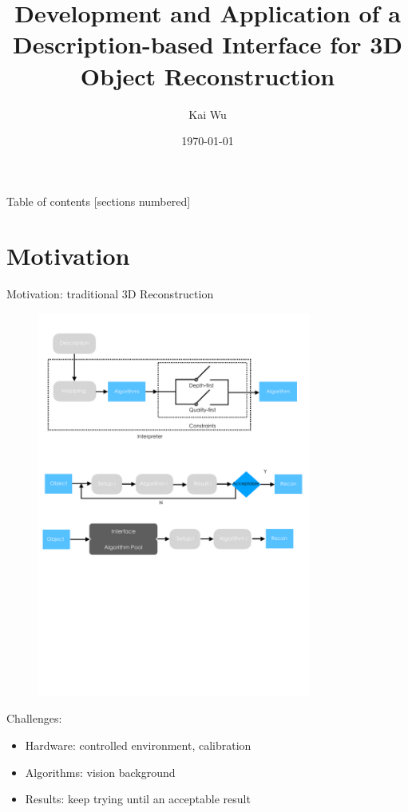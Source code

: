 \documentclass[10pt]{beamer}
\title[Interface of 3D Reconstruction]{Development and Application of a Description-based Interface for 3D Object Reconstruction} %
\author{Kai Wu}
\institute[UBC]
{
University of British Columbia \\ %
\medskip
kaywu@ece.ubc.ca \\ %
}
\date{\today}
\begin{document}
\begin{frame}
\maketitle
\end{frame}

\begin{frame}{Table of contents}
  [sections numbered]
  \tableofcontents[hideallsubsections]
\end{frame}


\section{Motivation}
\begin{frame}{Motivation: traditional 3D Reconstruction}

\begin{figure}
\centering
\includegraphics[width=0.8\textwidth]{images/traditional_3d_vision.pdf}
\end{figure}

Challenges:
\begin{itemize}
\item Hardware: controlled environment, calibration
\item Algorithms: vision background
\item Results: keep trying until an acceptable result
\end{itemize}

\end{frame}
\end{document}
